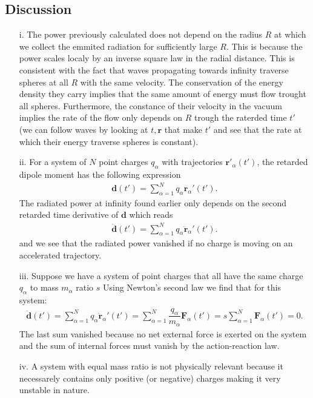\documentclass[10pt, a4paper]{article}
\begin{document}
{\subsection{Discussion}
\begin{enumerate}
    \item[i.] The power previously calculated does not depend on the radius $R$ at which we collect the emmited radiation for sufficiently large $R$. This is because the power scales localy by an inverse square law in the radial distance. This is consistent with the fact that waves propagating towards infinity traverse spheres at all $R$ with the same velocity. The conservation of the energy density they carry implies that the same amount of energy must flow trought all spheres. Furthermore, the constance of their velocity in the vacuum implies the rate of the flow only depends on $R$ trough the raterded time $t'$ (we can follow waves by looking at $t, \mathbf{r}$ that make $t'$ and see that the rate at which their energy traverse spheres is constant). 
    \item[ii.] For a system of $N$ point charges $q_\alpha$ with trajectories $\mathbf{r}'_\alpha(t')$, the retarded dipole moment has the following expression 
    \begin{align*}
        \mathbf{d}(t') = \sum_{\alpha=1}^N q_\alpha \mathbf{r}_\alpha'(t').  
    \end{align*}
    The radiated power at infinity found earlier only depends on the second retarded time derivative of $\mathbf{d}$ which reads 
    \begin{align*}
        \ddot{\mathbf{d}}(t') = \sum_{\alpha=1}^N q_\alpha \ddot{\mathbf{r}}_\alpha'(t').  
    \end{align*}
    and we see that the radiated power vanished if no charge is moving on an accelerated trajectory. 
    \item[iii.] Suppose we have a system of point charges that all have the same charge $q_\alpha$ to mass $m_\alpha$ ratio $s$ Using Newton's second law we find that for this system: 
    \begin{align*}
        \ddot{\mathbf{d}}(t') = \sum_{\alpha=1}^N q_\alpha \ddot{\mathbf{r}}_\alpha'(t') = \sum_{\alpha=1}^N \dfrac{q_\alpha}{m_\alpha} \mathbf{F}_\alpha(t') = s \sum_{\alpha=1}^N \mathbf{F}_\alpha(t') = 0.  
    \end{align*}
    The last sum vanished because no net external force is exerted on the system and the sum of internal forces must vanish by the action-reaction law.
    \item[iv.] A system with equal mass ratio is not physically relevant because it necessarely contains only positive (or negative) charges making it very unstable in nature. 
\end{enumerate}


}
\end{document}
